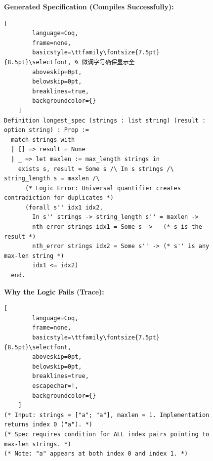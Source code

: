 \begin{figure}[t!] %
    \centering
    \begin{tcolorbox}[
        enhanced,
        title=\textbf{Case Study: Syntactically Valid but Semantically Incorrect Spec},
        fonttitle=\bfseries\small,
        colback=blue!3!white,    %
        colframe=blue!50!black,  %
        boxrule=0.8pt,
        arc=2pt,
        before skip=10pt,
        after skip=10pt
    ]
    
    \textbf{Generated Specification (Compiles Successfully):}
    \vspace{2pt}
    
    \begin{tcolorbox}[
        colback=white,
        colframe=white,
        frame hidden,       %
        boxrule=0pt,
        sharp corners,
        top=2pt, bottom=2pt, left=2pt, right=2pt
    ]
    \begin{lstlisting}[
        language=Coq, 
        frame=none, 
        basicstyle=\ttfamily\fontsize{7.5pt}{8.5pt}\selectfont, % 微调字号确保显示全
        aboveskip=0pt,
        belowskip=0pt,
        breaklines=true,
        backgroundcolor={} 
    ]
Definition longest_spec (strings : list string) (result : option string) : Prop :=
  match strings with
  | [] => result = None
  | _ => let maxlen := max_length strings in
    exists s, result = Some s /\ In s strings /\ string_length s = maxlen /\
      (* Logic Error: Universal quantifier creates contradiction for duplicates *)
      (forall s'' idx1 idx2, 
        In s'' strings -> string_length s'' = maxlen ->
        nth_error strings idx1 = Some s ->   (* s is the result *)
        nth_error strings idx2 = Some s'' -> (* s'' is any max-len string *)
        idx1 <= idx2)
  end.
    \end{lstlisting}
    \end{tcolorbox}

    \vspace{0.2cm}
    
    \textbf{Why the Logic Fails (Trace):}
    \vspace{2pt}
    
    \begin{tcolorbox}[
        colback=white,
        colframe=white,
        frame hidden,
        boxrule=0pt,
        sharp corners,
        top=2pt, bottom=2pt, left=2pt, right=2pt
    ]
    \begin{lstlisting}[
        language=Coq, 
        frame=none, 
        basicstyle=\ttfamily\fontsize{7.5pt}{8.5pt}\selectfont,
        aboveskip=0pt,
        belowskip=0pt,
        breaklines=true,
        escapechar=!,
        backgroundcolor={} 
    ]
(* Input: strings = ["a"; "a"], maxlen = 1. Implementation returns index 0 ("a"). *)
(* Spec requires condition for ALL index pairs pointing to max-len strings. *)
(* Note: "a" appears at both index 0 and index 1. *)


\end{lstlisting}
\end{tcolorbox}
\end{tcolorbox}
\end{figure}

